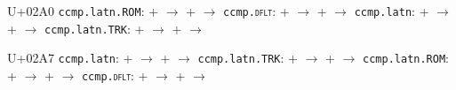\documentclass{article}
\begin{document}
\begin{substitutions}
U+02A0  \linebreak
    \texttt{ccmp.latn.ROM}:
\linebreak\null\quad{} \space +  \space $\to$  
\linebreak\null\quad{} \space +  \space $\to$  
\linebreak
\texttt{ccmp.\textsc{dflt}}:
\linebreak\null\quad{} \space +  \space $\to$  
\linebreak\null\quad{} \space +  \space $\to$  
\linebreak
\texttt{ccmp.latn}:
\linebreak\null\quad{} \space +  \space $\to$  
\linebreak\null\quad{} \space +  \space $\to$  
\linebreak
\texttt{ccmp.latn.TRK}:
\linebreak\null\quad{} \space +  \space $\to$  
\linebreak\null\quad{} \space +  \space $\to$  


\goodbreak

U+02A7  \linebreak
    \texttt{ccmp.latn}:
\linebreak\null\quad{} \space +  \space $\to$  
\linebreak\null\quad{} \space +  \space $\to$  
\linebreak
\texttt{ccmp.latn.TRK}:
\linebreak\null\quad{} \space +  \space $\to$  
\linebreak\null\quad{} \space +  \space $\to$  
\linebreak
\texttt{ccmp.latn.ROM}:
\linebreak\null\quad{} \space +  \space $\to$  
\linebreak\null\quad{} \space +  \space $\to$  
\linebreak
\texttt{ccmp.\textsc{dflt}}:
\linebreak\null\quad{} \space +  \space $\to$  
\linebreak\null\quad{} \space +  \space $\to$  


\goodbreak

\end{substitutions}
\end{document}

